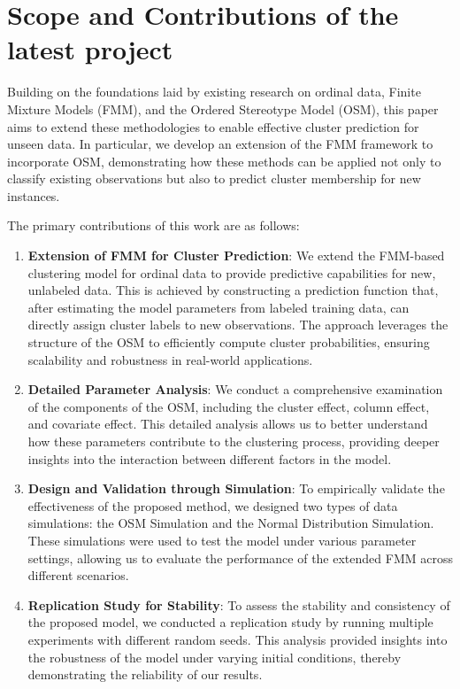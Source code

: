 \documentclass{article}
\begin{document}

\section{Scope and Contributions of the latest project}

Building on the foundations laid by existing research on ordinal data, Finite Mixture Models (FMM), and the Ordered Stereotype Model (OSM), this paper aims to extend these methodologies to enable effective cluster prediction for unseen data. In particular, we develop an extension of the FMM framework to incorporate OSM, demonstrating how these methods can be applied not only to classify existing observations but also to predict cluster membership for new instances.

The primary contributions of this work are as follows:

\begin{enumerate}
    \item \textbf{Extension of FMM for Cluster Prediction}: We extend the FMM-based clustering model for ordinal data to provide predictive capabilities for new, unlabeled data. This is achieved by constructing a prediction function that, after estimating the model parameters from labeled training data, can directly assign cluster labels to new observations. The approach leverages the structure of the OSM to efficiently compute cluster probabilities, ensuring scalability and robustness in real-world applications.

    \item \textbf{Detailed Parameter Analysis}: We conduct a comprehensive examination of the components of the OSM, including the cluster effect, column effect, and covariate effect. This detailed analysis allows us to better understand how these parameters contribute to the clustering process, providing deeper insights into the interaction between different factors in the model.

    \item \textbf{Design and Validation through Simulation}: To empirically validate the effectiveness of the proposed method, we designed two types of data simulations: the OSM Simulation and the Normal Distribution Simulation. These simulations were used to test the model under various parameter settings, allowing us to evaluate the performance of the extended FMM across different scenarios. 

    \item \textbf{Replication Study for Stability}: To assess the stability and consistency of the proposed model, we conducted a replication study by running multiple experiments with different random seeds. This analysis provided insights into the robustness of the model under varying initial conditions, thereby demonstrating the reliability of our results.
\end{enumerate}
\end{document}
